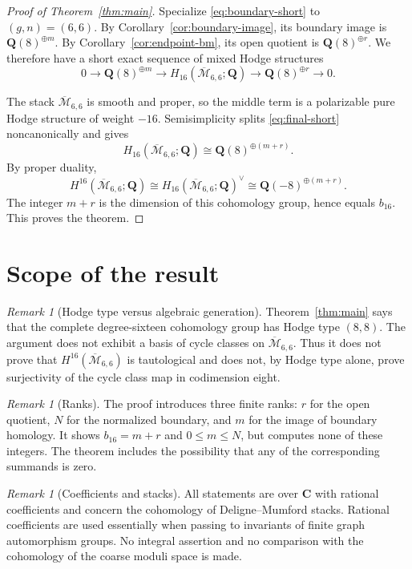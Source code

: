 \documentclass[12pt,reqno]{amsart}
\newcommand{\Q}{\mathbf{Q}}
\newcommand{\C}{\mathbf{C}}
\newcommand{\Mbar}{\overline{\mathcal{M}}}
\theoremstyle{definition}
\theoremstyle{remark}
\newtheorem{remark}[theorem]{Remark}
\begin{document}
\begin{proof}[Proof of Theorem~\ref{thm:main}]
Specialize \eqref{eq:boundary-short} to $(g,n)=(6,6)$.  By
Corollary~\ref{cor:boundary-image}, its boundary image is
$\Q(8)^{\oplus m}$.  By Corollary~\ref{cor:endpoint-bm}, its open quotient
is $\Q(8)^{\oplus r}$.  We therefore have a short exact sequence of mixed
Hodge structures
\begin{equation}\label{eq:final-short}
 0\longrightarrow\Q(8)^{\oplus m}
 \longrightarrow H_{16}(\Mbar_{6,6};\Q)
 \longrightarrow\Q(8)^{\oplus r}
 \longrightarrow0.
\end{equation}

The stack $\Mbar_{6,6}$ is smooth and proper, so the middle term is a
polarizable pure Hodge structure of weight $-16$.  Semisimplicity splits
\eqref{eq:final-short} noncanonically and gives
\[
 H_{16}(\Mbar_{6,6};\Q)
 \cong\Q(8)^{\oplus(m+r)}.
\]
By proper duality,
\[
 H^{16}(\Mbar_{6,6};\Q)
 \cong H_{16}(\Mbar_{6,6};\Q)^\vee
 \cong\Q(-8)^{\oplus(m+r)}.
\]
The integer $m+r$ is the dimension of this cohomology group, hence equals
$b_{16}$.  This proves the theorem.
\end{proof}

\section{Scope of the result}

\begin{remark}[Hodge type versus algebraic generation]
Theorem~\ref{thm:main} says that the complete degree-sixteen cohomology group
has Hodge type $(8,8)$.  The argument does not exhibit a basis of cycle
classes on $\Mbar_{6,6}$.  Thus it does not prove that
$H^{16}(\Mbar_{6,6})$ is tautological and does not, by Hodge type alone,
prove surjectivity of the cycle class map in codimension eight.
\end{remark}

\begin{remark}[Ranks]
The proof introduces three finite ranks: $r$ for the open quotient, $N$ for
the normalized boundary, and $m$ for the image of boundary homology.  It
shows $b_{16}=m+r$ and $0\leq m\leq N$, but computes none of these integers.
The theorem includes the possibility that any of the corresponding summands
is zero.
\end{remark}

\begin{remark}[Coefficients and stacks]
All statements are over $\C$ with rational coefficients and concern the
cohomology of Deligne--Mumford stacks.  Rational coefficients are used
essentially when passing to invariants of finite graph automorphism groups.
No integral assertion and no comparison with the cohomology of the coarse
moduli space is made.
\end{remark}
\end{document}
